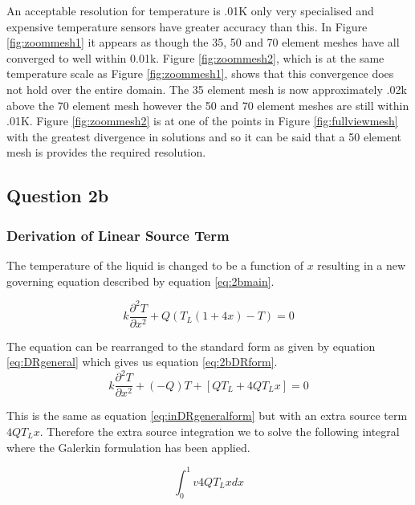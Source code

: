 \documentclass[11pt]{article}
\begin{document}
An acceptable resolution for temperature is .01K only very specialised and expensive temperature sensors have greater accuracy than this. In Figure \ref{fig:zoommesh1} it appears as though the 35, 50 and 70 element meshes have all converged to well within 0.01k. Figure \ref{fig:zoommesh2}, which is at the same temperature scale as Figure \ref{fig:zoommesh1}, shows that this convergence does not hold over the entire domain. The 35 element mesh is now approximately .02k above the 70 element mesh however the 50 and 70 element meshes are still within .01K. Figure \ref{fig:zoommesh2} is at one of the points in Figure \ref{fig:fullviewmesh} with the greatest divergence in solutions and so it can be said that a 50 element mesh is provides the required resolution.

\clearpage

\subsection{Question 2b}

\subsubsection{Derivation of Linear Source Term}

The temperature of the liquid is changed to be a function of $x$  resulting in a new governing equation described by equation \ref{eq:2bmain}.

\begin{equation} \label{eq:2bmain}
k \frac{\partial^2 T}{\partial x^2} + Q(T_L(1 + 4x) - T) = 0
\end{equation}



The equation can be rearranged to the standard form as given by equation \ref{eq:DRgeneral} which gives us equation \ref{eq:2bDRform}.
\begin{equation} \label{eq:2bDFform}
k \frac{\partial^2 T}{\partial x^2} + (-Q)T + \left [ QT_L + 4QT_Lx \right ] = 0
\end{equation}

This is the same as equation \ref{eq:inDRgeneralform} but with an extra source term $4QT_Lx$. Therefore the extra source integration we to solve the following integral where the Galerkin formulation has been applied.

\begin{equation*}
\int_{0}^{1}v4QT_Lx dx
\end{equation*}
\end{document}
